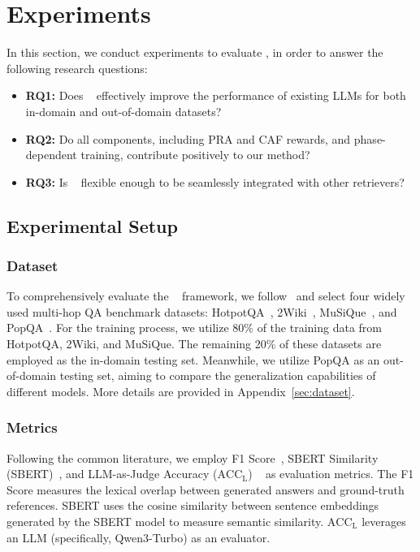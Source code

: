 

\section{Experiments}
In this section, we conduct experiments to evaluate \methodname, in order to answer the following research questions: 
\begin{itemize}[leftmargin=0.4cm]
    \item \textbf{RQ1:} Does \methodname~ effectively improve the performance of existing LLMs for both in-domain and out-of-domain datasets?
    \item \textbf{RQ2:} Do all components, including PRA and CAF rewards, and phase-dependent training, contribute positively to our method? %
    \item \textbf{RQ3:}  Is \methodname~ flexible enough to be seamlessly integrated with other retrievers? 
\end{itemize}



\subsection{Experimental Setup}
\subsubsection{Dataset}
To comprehensively evaluate the \methodname~ framework, we follow~\cite{jimenez2024hipporag,wang2025proprag} and select four widely used multi-hop QA benchmark datasets: HotpotQA~\cite{yang2018hotpotqa}, 2Wiki~\cite{ho2020constructing}, MuSiQue~\cite{trivedi2021musique}, and PopQA~\cite{mallen2023not}. 
For the training process, we utilize 80\% of the training data from HotpotQA, 2Wiki, and MuSiQue. 
The remaining 20\% of these datasets are employed as the in-domain testing set. 
Meanwhile, we utilize PopQA as an out-of-domain testing set, aiming to compare the generalization capabilities of different models. More details are provided in Appendix~\ref{sec:dataset}.

\subsubsection{Metrics}
Following the common literature, we employ F1 Score~\cite{wang2024kgp}, SBERT Similarity (SBERT)~\cite{thakurbeir}, and LLM-as-Judge Accuracy ($\mathrm{ACC_{L}}$) ~\cite{song2025r1searcher} as evaluation metrics. 
The F1 Score measures the lexical overlap between generated answers and ground-truth references. SBERT uses the cosine similarity between sentence embeddings generated by the SBERT model to measure semantic similarity. $\mathrm{ACC_{L}}$ leverages an LLM (specifically, Qwen3-Turbo) as an evaluator.


